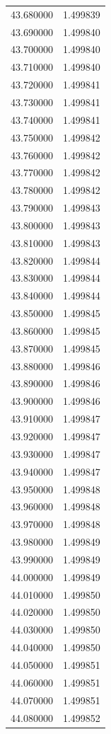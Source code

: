 \begin{tabular}{rr}
43.680000 & 1.499839 \\
43.690000 & 1.499840 \\
43.700000 & 1.499840 \\
43.710000 & 1.499840 \\
43.720000 & 1.499841 \\
43.730000 & 1.499841 \\
43.740000 & 1.499841 \\
43.750000 & 1.499842 \\
43.760000 & 1.499842 \\
43.770000 & 1.499842 \\
43.780000 & 1.499842 \\
43.790000 & 1.499843 \\
43.800000 & 1.499843 \\
43.810000 & 1.499843 \\
43.820000 & 1.499844 \\
43.830000 & 1.499844 \\
43.840000 & 1.499844 \\
43.850000 & 1.499845 \\
43.860000 & 1.499845 \\
43.870000 & 1.499845 \\
43.880000 & 1.499846 \\
43.890000 & 1.499846 \\
43.900000 & 1.499846 \\
43.910000 & 1.499847 \\
43.920000 & 1.499847 \\
43.930000 & 1.499847 \\
43.940000 & 1.499847 \\
43.950000 & 1.499848 \\
43.960000 & 1.499848 \\
43.970000 & 1.499848 \\
43.980000 & 1.499849 \\
43.990000 & 1.499849 \\
44.000000 & 1.499849 \\
44.010000 & 1.499850 \\
44.020000 & 1.499850 \\
44.030000 & 1.499850 \\
44.040000 & 1.499850 \\
44.050000 & 1.499851 \\
44.060000 & 1.499851 \\
44.070000 & 1.499851 \\
44.080000 & 1.499852 \\

\end{tabular}
